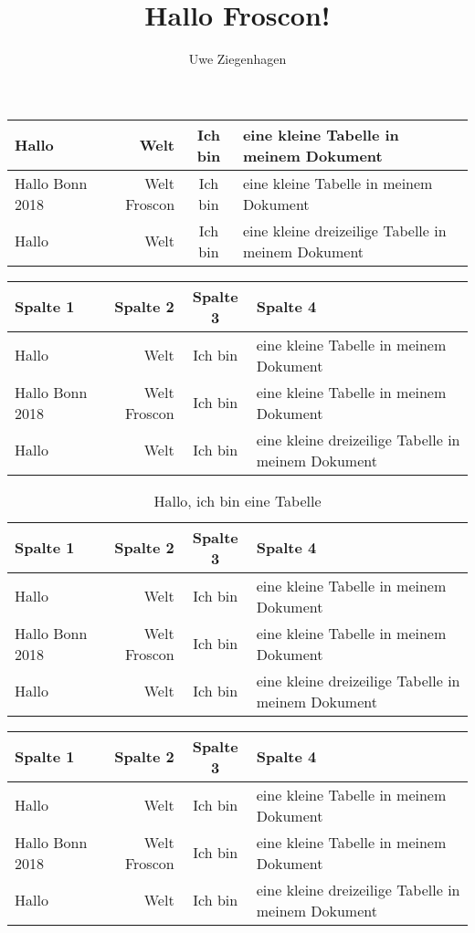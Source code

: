 \documentclass[ngerman]{scrreprt}
\title{Hallo Froscon!}
\author{Uwe Ziegenhagen}
\begin{document}
\listoftables

\clearpage

\begin{tabular}{|l|r|c|p{5cm}|} \hline
Hallo & Welt & Ich bin & eine kleine Tabelle in meinem Dokument \\ \hline
Hallo Bonn 2018 & Welt Froscon & Ich bin & eine kleine Tabelle in meinem Dokument \\ \hline
Hallo & Welt & Ich bin & eine kleine dreizeilige Tabelle in meinem Dokument \\ \hline
\end{tabular}

\vspace*{2cm}

\begin{tabular}{lrcp{5cm}} \toprule[2pt]
\textbf{Spalte 1} & \textbf{Spalte 2} & \textbf{Spalte 3} & \textbf{Spalte 4} \\ \midrule
Hallo & Welt & Ich bin & eine kleine Tabelle in meinem Dokument \\ 
Hallo Bonn 2018 & Welt Froscon & Ich bin & eine kleine Tabelle in meinem Dokument \\ 
Hallo & Welt & Ich bin & eine kleine dreizeilige Tabelle in meinem Dokument \\ \bottomrule[3pt]
\end{tabular}

\begin{table}[htb]
\caption{Hallo, ich bin eine Tabelle}
\begin{tabular}{lrcp{5cm}} \toprule[2pt]
\textbf{Spalte 1} & \textbf{Spalte 2} & \textbf{Spalte 3} & \textbf{Spalte 4} \\ \midrule
Hallo & Welt & Ich bin & eine kleine Tabelle in meinem Dokument \\ 
Hallo Bonn 2018 & Welt Froscon & Ich bin & eine kleine Tabelle in meinem Dokument \\ 
Hallo & Welt & Ich bin & eine kleine dreizeilige Tabelle in meinem Dokument \\ \bottomrule[3pt]
\end{tabular}
\end{table}


\begin{tabular}{lrcp{5cm}} \toprule[2pt]
\textbf{Spalte 1} & \textbf{Spalte 2} & \textbf{Spalte 3} & \textbf{Spalte 4} \\ \midrule
Hallo & Welt & Ich bin & eine kleine Tabelle in meinem Dokument \\ 
Hallo Bonn 2018 & Welt Froscon & Ich bin & eine kleine Tabelle in meinem Dokument \\ 
Hallo & Welt & Ich bin & eine kleine dreizeilige Tabelle in meinem Dokument \\ \bottomrule[3pt]
\end{tabular}
\end{document}

